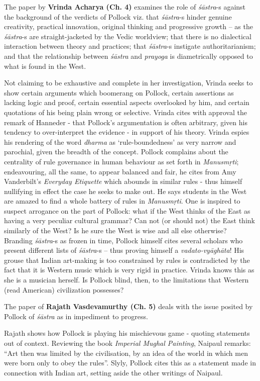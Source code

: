 The paper by {\bf Vrinda Acharya (Ch. 4)} examines the role of {\sl śāstra}-s against the background of the verdicts of Pollock viz. that {\sl śāstra}-s hinder genuine creativity, practical innovation, original thinking and progressive growth -- as the {\sl śāstra}-s are straight-jacketed by the Vedic worldview; that there is no dialectical interaction between theory and practices; that {\sl śāstra}-s instigate authoritarianism; and that the relationship between {\sl śāstra} and {\sl prayoga} is diametrically opposed to what is found in the West.

Not claiming to be exhaustive and complete in her investigation, Vrinda seeks to show certain arguments which boomerang on Pollock, certain assertions as lacking logic and proof, certain essential aspects overlooked by him, and certain quotations of his being plain wrong or selective. Vrinda cites with approval the remark of Hanneder - that Pollock’s argumentation is often arbitrary, given his tendency to over-interpret the evidence - in support of his theory. Vrinda espies his rendering of the word {\sl dharma} as ‘rule-boundedness’ as very narrow and parochial, given the breadth of the concept. Pollock complains about the centrality of rule governance in human behaviour as set forth in {\sl Manusmṛti}; endeavouring, all the same, to appear balanced and fair, he cites from Amy Vanderbilt’s {\sl Everyday Etiquette} which abounds in similar rules - thus himself nullifying in effect the case he seeks to make out. He says students in the West are amazed to find a whole battery of rules in {\sl Manusmṛti}. One is inspired to suspect arrogance on the part of Pollock: what if the West thinks of the East as having a very peculiar cultural grammar? Can not (or should not) the East think similarly of the West? Is he sure the West is wise and all else otherwise? Branding {\sl śāstra}-s as frozen in time, Pollock himself cites several scholars who present different lists of {\sl śāstra}-s -- thus proving himself a {\sl vadato-vyāghāta}! His grouse that Indian art-making is too constrained by rules is contradicted by the fact that it is Western music which is very rigid in practice. Vrinda knows this as she is a musician herself. Is Pollock blind, then, to the limitations that Western (read American) civilization possesses?

The paper of {\bf Rajath Vasdevamurthy (Ch. 5)} deals with the issue posited by Pollock  of {\sl śāstra} as in impediment to progress.

Rajath shows how Pollock is playing his mischievous game - quoting statements out of context. Reviewing the book {\sl Imperial Mughal Painting}, Naipaul remarks: “Art then was limited by the civilisation, by an idea of the world in which men were born only to obey the rules”. Slyly, Pollock cites this as a statement made in connection with Indian art, setting aside the other writings of Naipaul.

